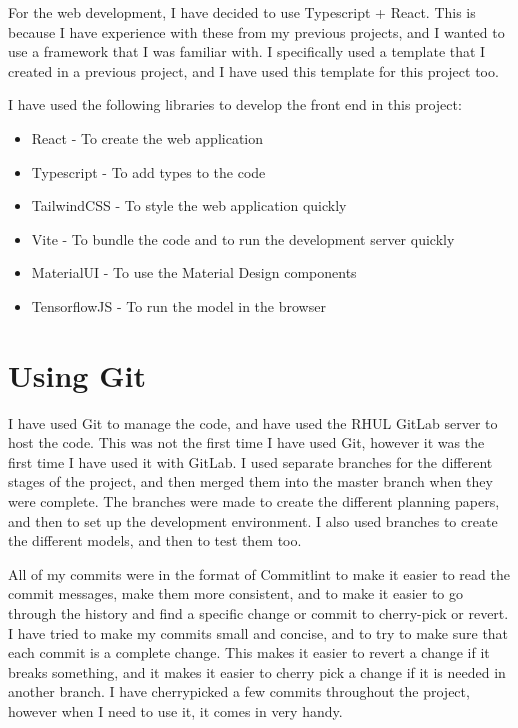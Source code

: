 \documentclass[]{final_report}
\begin{document}
For the web development, I have decided to use Typescript + React. This is because I have experience with these from my previous projects, and I wanted to use a framework that I was familiar with. I specifically used a template\cite{TypescriptProjectTemplate} that I created in a previous project, and I have used this template for this project too.

I have used the following libraries to develop the front end in this project:
\begin{itemize}
  \item React\cite{React} - To create the web application
  \item Typescript\cite{Typescript} - To add types to the code
  \item TailwindCSS\cite{tailwindcss} - To style the web application quickly
  \item Vite\cite{Vite} - To bundle the code and to run the development server quickly
  \item MaterialUI\cite{MaterialUI} - To use the Material Design components
  \item TensorflowJS\cite{smilkov2019tensorflowjs} - To run the model in the browser
\end{itemize}

\section{Using Git}
I have used Git to manage the code, and have used the RHUL GitLab server to host the code.
This was not the first time I have used Git, however it was the first time I have used it with GitLab.
I used separate branches for the different stages of the project, and then merged them into the master branch when they were complete.
The branches were made to create the different planning papers, and then to set up the development environment.
I also used branches to create the different models, and then to test them too.

All of my commits were in the format of Commitlint\cite{CommitLint} to make it easier to read the commit messages, make them more consistent,
and to make it easier to go through the history and find a specific change or commit to cherry-pick or revert.
I have tried to make my commits small and concise, and to try to make sure that each commit is a complete change.
This makes it easier to revert a change if it breaks something, and it makes it easier to cherry pick a change if it is needed in another branch. I have cherrypicked a few commits throughout the project, however when I need to use it, it comes in very handy.
\end{document}
